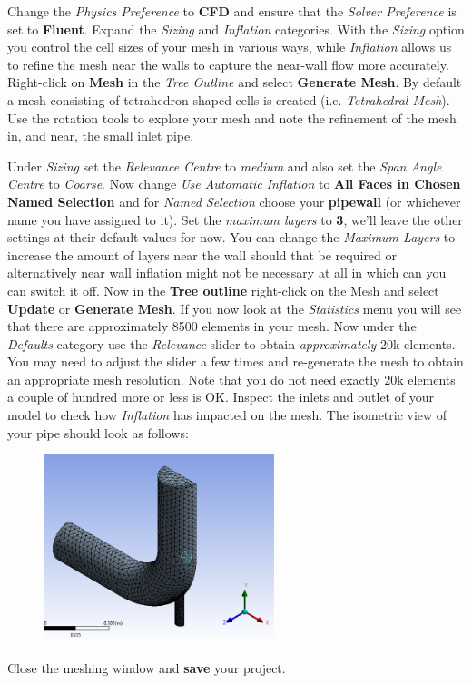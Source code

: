 \documentclass[12pts,a4paper,amsmath,amssymb,floatfix]{article}%
\newcommand\bfr[1]{\textcolor[rgb]{1,0.00,0.00}{\textbf{\textsf{#1}}}}
\begin{document}
\medskip

Change the \emph{Physics Preference} to \bfr{CFD} and ensure that the \emph{Solver Preference} is set to \bfr{Fluent}. Expand the \emph{Sizing} and \emph{Inflation} categories. With the \emph{Sizing} option you control the cell sizes of your mesh in various ways, while \emph{Inflation} allows us to refine the mesh near the walls to capture the near-wall flow more accurately. Right-click on \bfr{Mesh} in the \emph{Tree Outline} and select \bfr{Generate Mesh}. By default a mesh consisting of tetrahedron shaped cells is created (i.e. \emph{Tetrahedral Mesh}). Use the rotation tools to explore your mesh and note the refinement of the mesh in, and near, the small inlet pipe.

\medskip
Under \emph{Sizing} set the \emph{Relevance Centre} to \emph{medium} and also set the \emph{Span Angle Centre} to \emph{Coarse}. Now change \emph{Use Automatic Inflation} to \bfr{All Faces in Chosen Named Selection} and for \emph{Named Selection} choose your \bfr{pipewall} (or whichever name you have assigned to it). Set the \emph{maximum layers} to \bfr{3}, we'll leave the other settings at their default values for now. You can change the \emph{Maximum Layers} to increase the amount of layers near the wall should that be required or alternatively near wall inflation might not be necessary at all in which can you can switch it off. Now in the \bfr{Tree outline} right-click on the Mesh and select \bfr{Update} or \bfr{Generate Mesh}. If you now look at the \emph{Statistics} menu you will see that there are approximately 8500 elements in your mesh. Now under the \emph{Defaults} category use the \emph{Relevance} slider to obtain \emph{approximately} 20k elements. You may need to adjust the slider a few times and re-generate the mesh to obtain an appropriate mesh resolution. Note that you do not need exactly 20k elements a couple of hundred more or less is OK. Inspect the inlets and outlet of your model to check how \emph{Inflation} has impacted on the mesh. The isometric view of your pipe should look as follows:

\begin{figure}[H]
\begin{center}
\includegraphics[width=0.6\textwidth,clip]{./Pics/isom_view_pipe.png}
\end{center}
\end{figure}
Close the meshing window and \bfr{save} your project.
\end{document}
